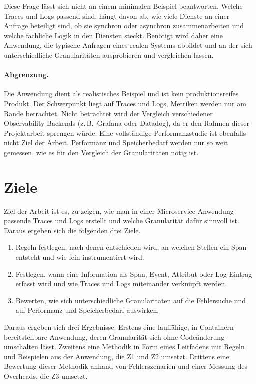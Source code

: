\documentclass[11pt, a4paper]{article}
\begin{document}
Diese Frage lässt sich nicht an einem minimalen Beispiel beantworten. Welche Traces und Logs passend sind, hängt davon ab, wie viele Dienste an einer Anfrage beteiligt sind, ob sie synchron oder asynchron zusammenarbeiten und welche fachliche Logik in den Diensten steckt. Benötigt wird daher eine Anwendung, die typische Anfragen eines realen Systems abbildet und an der sich unterschiedliche Granularitäten ausprobieren und vergleichen lassen.

\paragraph{Abgrenzung.} Die Anwendung dient als realistisches Beispiel und ist kein produktionsreifes Produkt. Der Schwerpunkt liegt auf Traces und Logs, Metriken werden nur am Rande betrachtet. Nicht betrachtet wird der Vergleich verschiedener Observability-Backends (z.\,B.\ Grafana oder Datadog), da er den Rahmen dieser Projektarbeit sprengen würde. Eine vollständige Performanzstudie ist ebenfalls nicht Ziel der Arbeit. Performanz und Speicherbedarf werden nur so weit gemessen, wie es für den Vergleich der Granularitäten nötig ist.

\section{Ziele}

Ziel der Arbeit ist es, zu zeigen, wie man in einer Microservice-Anwendung passende Traces und Logs erstellt und welche Granularität dafür sinnvoll ist. Daraus ergeben sich die folgenden drei Ziele.

\begin{enumerate}[label=\textbf{Z\arabic*}, leftmargin=*, nosep]
    \item Regeln festlegen, nach denen entschieden wird, an welchen Stellen ein Span entsteht und wie fein instrumentiert wird.
    \item Festlegen, wann eine Information als Span, Event, Attribut oder Log-Eintrag erfasst wird und wie Traces und Logs miteinander verknüpft werden.
    \item Bewerten, wie sich unterschiedliche Granularitäten auf die Fehlersuche und auf Performanz und Speicherbedarf auswirken.
\end{enumerate}

Daraus ergeben sich drei Ergebnisse. Erstens eine lauffähige, in Containern bereitstellbare Anwendung, deren Granularität sich ohne Codeänderung umschalten lässt. Zweitens eine Methodik in Form eines Leitfadens mit Regeln und Beispielen aus der Anwendung, die Z1 und Z2 umsetzt. Drittens eine Bewertung dieser Methodik anhand von Fehlerszenarien und einer Messung des Overheads, die Z3 umsetzt.
\end{document}
